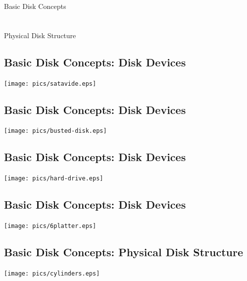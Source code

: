 \documentclass[xga]{xdvislides}
\begin{document}
\vspace*{\fill}
\begin{center}
	\Hugesize
		Basic Disk Concepts\\ [1em]
	\hspace*{5mm}
	\blueline\\
	\hspace*{5mm}\\
		Physical Disk Structure
\end{center}
\vspace*{\fill}

\subsection{Basic Disk Concepts: Disk Devices}
\vfill
	\begin{center}
		\texttt{[image: pics/satavide.eps]} \\
	\end{center}
\vfill


\subsection{Basic Disk Concepts: Disk Devices}
	\begin{center}
		\texttt{[image: pics/busted-disk.eps]} \\
	\end{center}

\subsection{Basic Disk Concepts: Disk Devices}
\vfill
	\begin{center}
		\texttt{[image: pics/hard-drive.eps]} \\
	\end{center}
\vfill


\subsection{Basic Disk Concepts: Disk Devices}
\vfill
	\begin{center}
		\texttt{[image: pics/6platter.eps]} \\
	\end{center}
\vfill

\subsection{Basic Disk Concepts: Physical Disk Structure}
\vfill
	\begin{center}
		\texttt{[image: pics/cylinders.eps]} \\
	\end{center}
\vfill
\end{document}
